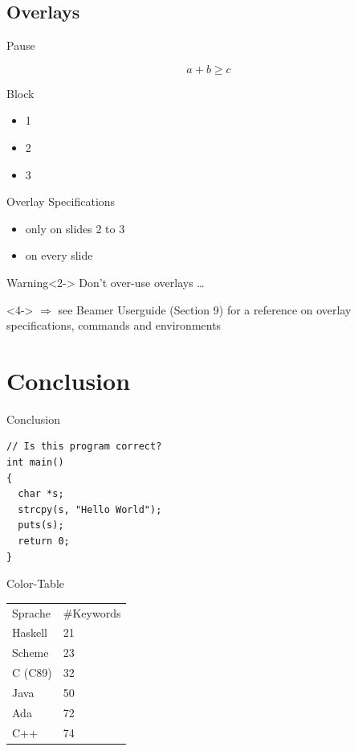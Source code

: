 \documentclass[xcolor={dvipsnames,table}]{beamer}
\begin{document}
  \subsection{Overlays}

  \begin{frame}{Pause}
    \begin{example}
      \begin{equation}
        a + b \geq c
      \end{equation}
    \end{example}
    \pause
    \begin{block}{Block}
      \begin{itemize}
        \item 1
          \pause
        \item 2
        \item 3
      \end{itemize}
    \end{block}
  \end{frame}

  \begin{frame}{Overlay Specifications}
    \begin{itemize}
      \item<2-3> only on slides 2 to 3
      \item<1-> on every slide
    \end{itemize}
    \begin{block}{Warning}<2->
      \alert{Don't over-use overlays \dots}
    \end{block}
    \vspace{3em}
    \begin{onlyenv}<4->
      $\Rightarrow$ see Beamer Userguide (Section 9) for a reference on overlay
      specifications, commands and environments
    \end{onlyenv}
  \end{frame}

\section{Conclusion}

\begin{frame}[fragile]{Conclusion}
  \begin{lstlisting}
// Is this program correct?
int main()
{
  char *s;
  strcpy(s, "Hello World");
  puts(s);
  return 0;
}
\end{lstlisting}
\end{frame}

\begin{frame}{Color-Table}
\begin{tabular}{ll}
  \rowcolor{black}
  \color{white} Sprache & \color{white} \#Keywords \\
 Haskell &  21 \\
 Scheme &  23 \\
 C (C89) &  32 \\
 Java &  50 \\
 Ada &  72 \\
 C++ &  74 \\
\end{tabular}
\end{frame}
\end{document}
